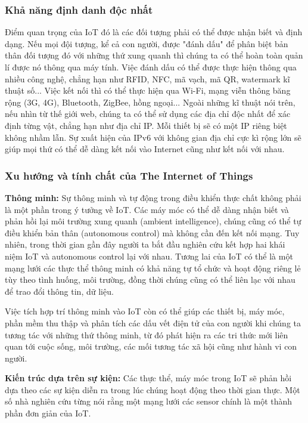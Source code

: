 \subsubsection*{Khả năng định danh độc nhất }
Điểm quan trọng của IoT đó là các đối tượng phải có thể được nhận biết và định dạng. Nếu mọi đội tượng, kể cả con người, được "đánh dấu" để phân biệt bản thân đối tượng đó với những thứ xung quanh thì chúng ta có thể hoàn toàn quản lí được nó thông qua máy tính. Việc đánh dấu có thể được thực hiện thông qua nhiều công nghệ, chẳng hạn như RFID, NFC, mã vạch, mã QR, watermark kĩ thuật số... Việc kết nối thì có thể thực hiện qua Wi-Fi, mạng viễn thông băng rộng (3G, 4G), Bluetooth, ZigBee, hồng ngoại...
Ngoài những kĩ thuật nói trên, nếu nhìn từ thế giới web, chúng ta có thể sử dụng các địa chỉ độc nhất để xác định từng vật, chẳng hạn như địa chỉ IP. Mỗi thiết bị sẽ có một IP riêng biệt không nhầm lẫn. Sự xuất hiện của IPv6 với không gian địa chỉ cực kì rộng lớn sẽ giúp mọi thứ có thể dễ dàng kết nối vào Internet cũng như kết nối với nhau.

\subsubsection*{Xu hướng và tính chất của The Internet of Things}
\textbf{Thông minh:} Sự thông minh và tự động trong điều khiển thực chất không phải là một phần trong ý tưởng về IoT. Các máy móc có thể dễ dàng nhận biết và phản hồi lại môi trường xung quanh (ambient intelligence), chúng cũng có thể tự điều khiển bản thân (autonomous control) mà không cần đến kết nối mạng. Tuy nhiên, trong thời gian gần đây người ta bắt đầu nghiên cứu kết hợp hai khái niệm IoT và autonomous control lại với nhau. Tương lai của IoT có thể là một mạng lưới các thực thể thông minh có khả năng tự tổ chức và hoạt động riêng lẻ tùy theo tình huống, môi trường, đồng thời chúng cũng có thể liên lạc với nhau để trao đổi thông tin, dữ liệu.

Việc tích hợp trí thông minh vào IoT còn có thể giúp các thiết bị, máy móc, phần mềm thu thập và phân tích các dấu vết điện tử của con người khi chúng ta tương tác với những thứ thông minh, từ đó phát hiện ra các tri thức mới liên quan tới cuộc sống, môi trường, các mối tương tác xã hội cũng như hành vi con người.

\textbf{Kiến trúc dựa trên sự kiện:} Các thực thể, máy móc trong IoT sẽ phản hồi dựa theo các sự kiện diễn ra trong lúc chúng hoạt động theo thời gian thực. Một số nhà nghiên cứu từng nói rằng một mạng lưới các sensor chính là một thành phần đơn giản của IoT.

